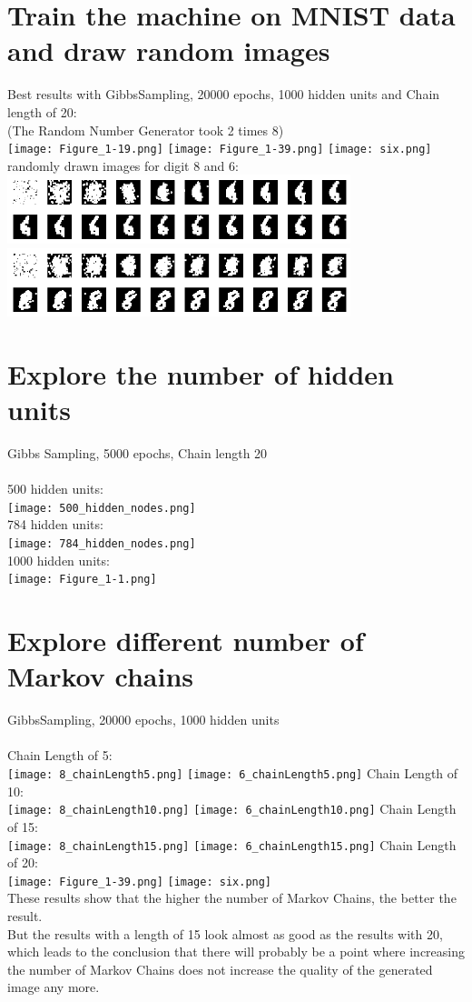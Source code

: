 \documentclass[a4paper]{article}
\begin{document}
\section{Train the machine on MNIST data and draw random images}
Best results with GibbsSampling, 20000 epochs, 1000 hidden units and Chain length of 20: \\
(The Random Number Generator took 2 times 8)\\
\texttt{[image: Figure\_1-19.png]}
\texttt{[image: Figure\_1-39.png]}
\texttt{[image: six.png]}
 randomly drawn images for digit 8 and 6:\\
\includegraphics[width=0.75\textwidth]{6_chain_20.png}\\
\includegraphics[width=0.75\textwidth]{8_chain_20.png}
\newpage
\section{Explore the number of hidden units}
Gibbs Sampling, 5000 epochs, Chain length 20\\\\
500 hidden units:\\
\texttt{[image: 500\_hidden\_nodes.png]}\\
784 hidden units:\\
\texttt{[image: 784\_hidden\_nodes.png]}\\
1000 hidden units:\\
\texttt{[image: Figure\_1-1.png]}
\section{Explore different number of Markov chains}
GibbsSampling, 20000 epochs, 1000 hidden units\\
\\
Chain Length of 5:\\
\texttt{[image: 8\_chainLength5.png]}
\texttt{[image: 6\_chainLength5.png]}
Chain Length of 10:\\
\texttt{[image: 8\_chainLength10.png]}
\texttt{[image: 6\_chainLength10.png]}
Chain Length of 15:\\
\texttt{[image: 8\_chainLength15.png]}
\texttt{[image: 6\_chainLength15.png]}
\newpage
Chain Length of 20:\\
\texttt{[image: Figure\_1-39.png]}
\texttt{[image: six.png]}\\
These results show that the higher the number of Markov Chains, the better the result.\\
But the results with a length of 15 look almost as good as the results with 20, which leads to the conclusion that there will probably be a point where increasing the number of Markov Chains does not increase the quality of the generated image any more.
\end{document}
